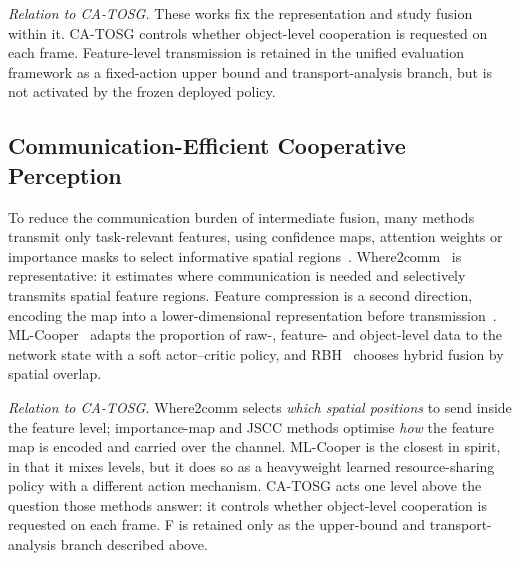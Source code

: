 \documentclass[journal]{IEEEtran}
\newcommand{\method}{CA-TOSG}
\begin{document}
\emph{Relation to \method{}.} These works fix the representation and study fusion within it.
\method{} controls whether object-level cooperation is requested on each frame. Feature-level
transmission is retained in the unified evaluation framework as a fixed-action upper bound and
transport-analysis branch, but is not activated by the frozen deployed policy.

\subsection{Communication-Efficient Cooperative Perception}
To reduce the communication burden of intermediate fusion, many methods transmit only task-relevant
features, using confidence maps, attention weights or importance masks to select informative spatial
regions~\cite{hu2022where2comm,sheng2024importance,li2021disconet,liu2020when2com}.
Where2comm~\cite{hu2022where2comm} is representative: it estimates where communication is needed and
selectively transmits spatial feature regions. Feature compression is a second direction, encoding
the map into a lower-dimensional representation before
transmission~\cite{sheng2024importance,zhang2024smartcooper}. ML-Cooper~\cite{xie2022mlcooper} adapts
the proportion of raw-, feature- and object-level data to the network state with a soft
actor--critic policy, and RBH~\cite{liu2024rbh} chooses hybrid fusion by spatial overlap.

\emph{Relation to \method{}.} Where2comm selects \emph{which spatial positions} to send inside the
feature level; importance-map and JSCC methods optimise \emph{how} the feature map is encoded and
carried over the channel. ML-Cooper is the
closest in spirit, in that it mixes levels, but it does so as a heavyweight learned resource-sharing
policy with a different action mechanism. \method{} acts one level above the question those methods
answer: it controls whether object-level cooperation is requested on each frame. F is retained only
as the upper-bound and transport-analysis branch described above.
\end{document}
